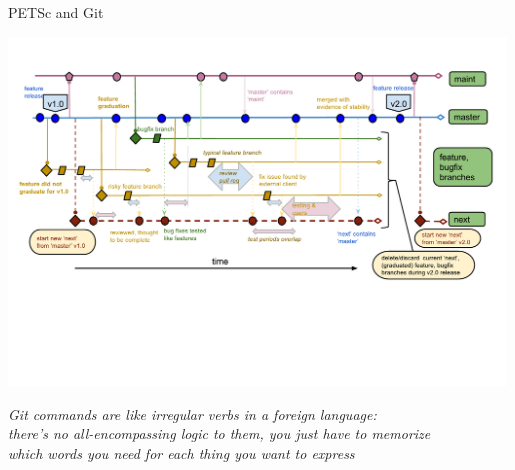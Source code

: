 \begin{frame}{PETSc and Git}
  \begin{center}
    \includegraphics[width=0.99\textwidth]{figures/gitworkflows-95}
  \end{center}
  \begin{flushright} \vspace*{-1.2cm}
   \textit{Git commands are like irregular verbs in a foreign language: \\
           there’s no all-encompassing logic to them, you just have to memorize \\
           which words you need for each thing you want to express}
  \end{flushright}
\end{frame}

